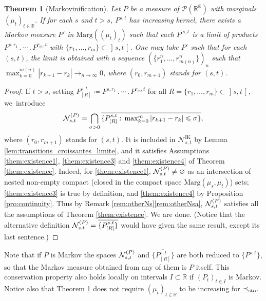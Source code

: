 \documentclass[11pt]{article}
\newcommand{\ldot}{\mathbin{.}}
\newcommand{\lcdots}{\ldot\cdots\ldot}
\theoremstyle{plain}
\newtheorem{them}{Theorem}[section]
\theoremstyle{definition}
\newcommand{\IT}{\mathrm{IK}}
\newcommand{\eqdef}{\coloneqq}
\newcommand{\p}{\mathcal{P}}
\newcommand{\ma}{\mathrm{Marg}}
\newcommand{\R}{\mathbb{R}}
\newcommand{\leqs}{\preceq_{\text{\rm sto}}}
\newcommand{\op}{\mathopen}
\newcommand{\clo}{\mathclose}
\begin{document}
\begin{them}[Markovinification]\label{them:sous_n}
Let $P$ be a measure of\/ $\p(\R^\R)$ with marginals $(\mu_t)_{t\in \R}$. If for each $s$ and $t>s$, $P^{s,t}$ has increasing kernel, there exists a Markov measure $P'$ in $\ma((\mu_t)_t)$ such that each $P^{\prime s,t}$ is a limit of products $P^{s,r_1}\lcdots P^{r_m,t}$ with $\{r_1,\ldots,r_m\}\subset\op]s,t\clo[$. One may take $P'$ such that for each $(s,t)$, the limit is obtained with a sequence $(\{r^n_1,\ldots,r^n_{m(n)}\})_n$ such that $\max_{k=0}^{m(n)} |r_{k+1}-r_k|\to_{n\to\infty}0$, where $(r_0,r_{m+1})$ stands for $(s,t)$.
\end{them}

\begin{proof} If $t>s$, setting $P_{[R]}^{s,t}\eqdef P^{s,r_1}\lcdots P^{r_m,t}$ for all $R=\{r_1,\ldots,r_m\}\subset\op]s,t\clo[$, we~introduce
\[
\mathcal{N}_{s,t}^{\rm (P)}=\bigcap_{\sigma>0}\overline{\{P_{[R]}^{s,t}:\,\max\nolimits_{k=0}^m |r_{k+1}-r_k|\leqslant\sigma\}},
\]
where $(r_0,r_{m+1})$ stands for $(s,t)$. It is included in $\mathcal{N}_{s,t}^\IT$ by Lemma \ref{lem:transitions_croissantes_limite}, and it satisfies Assumptions \eqref{them:existence1}, \eqref{them:existence3} and \eqref{them:existence4} of Theorem \ref{them:existence}. Indeed, for \eqref{them:existence1}, $\mathcal{N}_{s,t}^{\rm (P)}\neq\varnothing$ as an intersection of nested non-empty compact (closed in the compact space $\ma(\mu_s,\mu_t)$) sets; \eqref{them:existence3} is true by definition, and \eqref{them:existence4} by Proposition \ref{pro:continuity}. Thus by Remark \ref{rem:otherNs}\eqref{rem:otherNsa}, $\mathcal{N}_{s,t}^{\rm (P)}$ satisfies all the assumptions of Theorem \ref{them:existence}. We are done. (Notice that the alternative definition $\mathcal{N}_{s,t}^{\rm (P)}=\overline{\{P_{[R]}^{s,t}\}}$ would have given the same result, except its last sentence.)
\end{proof}

Note that if $P$ is Markov the spaces $\mathcal{N}_{s,t}^{\rm (P)}$ and $\overline{\{P_{[R]}^{s,t}\}}$ are both reduced to $\{P^{s,t}\}$, so that the Markov measure obtained from any of them is $P$ itself. This conservation property also holds locally on intervals $I\subset \R$ if $(P_t)_{t\in I}$ is Markov. Notice also that Theorem \ref{them:sous_n} does not require $(\mu_t)_{t\in\R}$ to be increasing for $\leqs $.
\end{document}

